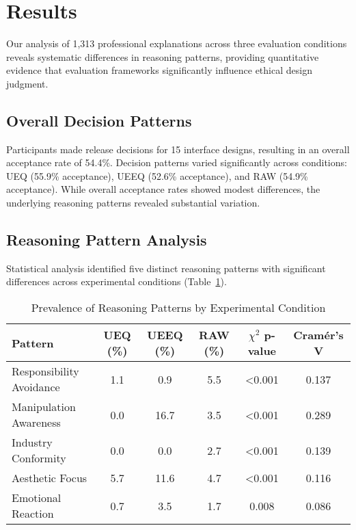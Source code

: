 
\section{Results}

Our analysis of 1,313 professional explanations across three evaluation conditions reveals systematic differences in reasoning patterns, providing quantitative evidence that evaluation frameworks significantly influence ethical design judgment.

\subsection{Overall Decision Patterns}
Participants made release decisions for 15 interface designs, resulting in an overall acceptance rate of 54.4\%. Decision patterns varied significantly across conditions: UEQ (55.9\% acceptance), UEEQ (52.6\% acceptance), and RAW (54.9\% acceptance). While overall acceptance rates showed modest differences, the underlying reasoning patterns revealed substantial variation.

\subsection{Reasoning Pattern Analysis}

Statistical analysis identified five distinct reasoning patterns with significant differences across experimental conditions (Table~\ref{tab:reasoning-patterns}).

\begin{table}
\caption{Prevalence of Reasoning Patterns by Experimental Condition}
\label{tab:reasoning-patterns}
\begin{tabular}{lccccc}
\toprule
\textbf{Pattern} & \textbf{UEQ (\%)} & \textbf{UEEQ (\%)} & \textbf{RAW (\%)} & \textbf{$\chi^2$ p-value} & \textbf{Cramér's V} \\
\midrule
Responsibility Avoidance & 1.1 & 0.9 & 5.5 & <0.001 & 0.137 \\
Manipulation Awareness & 0.0 & 16.7 & 3.5 & <0.001 & 0.289 \\
Industry Conformity & 0.0 & 0.0 & 2.7 & <0.001 & 0.139 \\
Aesthetic Focus & 5.7 & 11.6 & 4.7 & <0.001 & 0.116 \\
Emotional Reaction & 0.7 & 3.5 & 1.7 & 0.008 & 0.086 \\
\bottomrule
\end{tabular}
\end{table}

